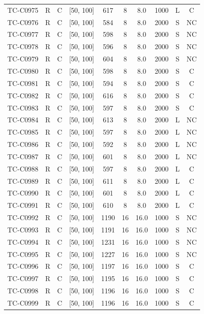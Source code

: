\begin{longtable}{lccccccccc}
TC-C0975 & R & C & [50, 100] & 617 & 8 & 8.0 & 1000 & L & C \\
TC-C0976 & R & C & [50, 100] & 584 & 8 & 8.0 & 2000 & S & NC \\
TC-C0977 & R & C & [50, 100] & 598 & 8 & 8.0 & 2000 & S & NC \\
TC-C0978 & R & C & [50, 100] & 596 & 8 & 8.0 & 2000 & S & NC \\
TC-C0979 & R & C & [50, 100] & 604 & 8 & 8.0 & 2000 & S & NC \\
TC-C0980 & R & C & [50, 100] & 598 & 8 & 8.0 & 2000 & S & C \\
TC-C0981 & R & C & [50, 100] & 594 & 8 & 8.0 & 2000 & S & C \\
TC-C0982 & R & C & [50, 100] & 616 & 8 & 8.0 & 2000 & S & C \\
TC-C0983 & R & C & [50, 100] & 597 & 8 & 8.0 & 2000 & S & C \\
TC-C0984 & R & C & [50, 100] & 613 & 8 & 8.0 & 2000 & L & NC \\
TC-C0985 & R & C & [50, 100] & 597 & 8 & 8.0 & 2000 & L & NC \\
TC-C0986 & R & C & [50, 100] & 592 & 8 & 8.0 & 2000 & L & NC \\
TC-C0987 & R & C & [50, 100] & 601 & 8 & 8.0 & 2000 & L & NC \\
TC-C0988 & R & C & [50, 100] & 597 & 8 & 8.0 & 2000 & L & C \\
TC-C0989 & R & C & [50, 100] & 611 & 8 & 8.0 & 2000 & L & C \\
TC-C0990 & R & C & [50, 100] & 601 & 8 & 8.0 & 2000 & L & C \\
TC-C0991 & R & C & [50, 100] & 610 & 8 & 8.0 & 2000 & L & C \\
TC-C0992 & R & C & [50, 100] & 1190 & 16 & 16.0 & 1000 & S & NC \\
TC-C0993 & R & C & [50, 100] & 1191 & 16 & 16.0 & 1000 & S & NC \\
TC-C0994 & R & C & [50, 100] & 1231 & 16 & 16.0 & 1000 & S & NC \\
TC-C0995 & R & C & [50, 100] & 1227 & 16 & 16.0 & 1000 & S & NC \\
TC-C0996 & R & C & [50, 100] & 1197 & 16 & 16.0 & 1000 & S & C \\
TC-C0997 & R & C & [50, 100] & 1195 & 16 & 16.0 & 1000 & S & C \\
TC-C0998 & R & C & [50, 100] & 1196 & 16 & 16.0 & 1000 & S & C \\
TC-C0999 & R & C & [50, 100] & 1196 & 16 & 16.0 & 1000 & S & C \\

\end{longtable}
